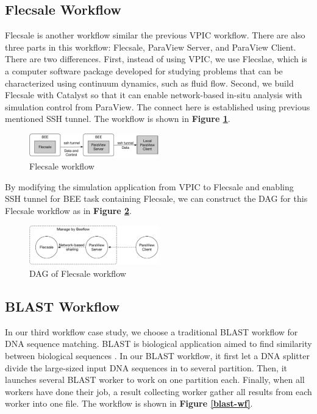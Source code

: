 \subsection{Flecsale Workflow}
Flecsale \cite{flecsale} is another workflow similar the previous VPIC workflow. There are also three parts in this workflow: Flecsale, ParaView Server, and ParaView Client. There are two differences. First, instead of using VPIC, we use Flecslae, which is a computer software package developed for studying problems that can be characterized using continuum dynamics, such as fluid flow. Second, we build Flecsale with Catalyst so that it can enable network-based in-situ analysis with simulation control from ParaView. The connect here is established using previous mentioned SSH tunnel. The workflow is shown in \textbf{Figure \ref{flecsale-wf}}.

\begin{figure}[h]
    \centering
    \caption{Flecsale workflow}
    \label{flecsale-wf}
    \includegraphics[width=0.5\textwidth]{figures/flecsale.pdf}
\end{figure}

By modifying the simulation application from VPIC to Flecsale and enabling SSH tunnel for BEE task containing Flecsale, we can construct the DAG for this Flecsale workflow as in \textbf{Figure \ref{fecsale-dag}}.

\begin{figure}[h]
    \centering
    \caption{DAG of Flecsale workflow}
    \label{fecsale-dag}
    \includegraphics[width=0.5\textwidth]{figures/flecsale-beeflow.pdf}
\end{figure}

\subsection{BLAST Workflow}
In our third workflow case study, we choose a traditional BLAST workflow for DNA sequence matching. BLAST is biological application aimed to find similarity between biological sequences \cite{altschul1990basic}. In our BLAST workflow, it first let a DNA splitter divide the large-sized input DNA sequences in to several partition. Then, it launches several BLAST worker to work on one partition each. Finally, when all workers have done their job, a result collecting worker gather all results from each worker into one file. The workflow is shown in \textbf{Figure \ref{blast-wf}}.

